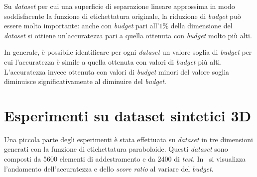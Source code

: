 Su \emph{dataset} per cui una superficie di separazione lineare approssima in modo soddisfacente la funzione di etichettatura originale, la riduzione di \emph{budget} può essere molto importante: anche con \emph{budget} pari all'$1\%$ della dimensione del \emph{dataset} si ottiene un'accuratezza pari a quella ottenuta con \emph{budget} molto più alti.

In generale, è possibile identificare per ogni \emph{dataset} un valore soglia di \emph{budget} per cui l'accuratezza è simile a quella ottenuta con valori di \emph{budget} più alti. 
L'accuratezza invece ottenuta con valori di \emph{budget} minori del valore soglia diminuisce significativamente al diminuire del \emph{budget}.
\section{Esperimenti su dataset sintetici 3D}\label{sec:exp:synth_3d}
Una piccola parte degli esperimenti è stata effettuata su \emph{dataset} in tre dimensioni generati con la funzione di etichettatura paraboloide.
Questi \emph{dataset} sono composti da 5600 elementi di addestramento e da 2400 di \emph{test}.
In~ si visualizza l'andamento dell'accuratezza e dello \emph{score ratio} al variare del \emph{budget}.
